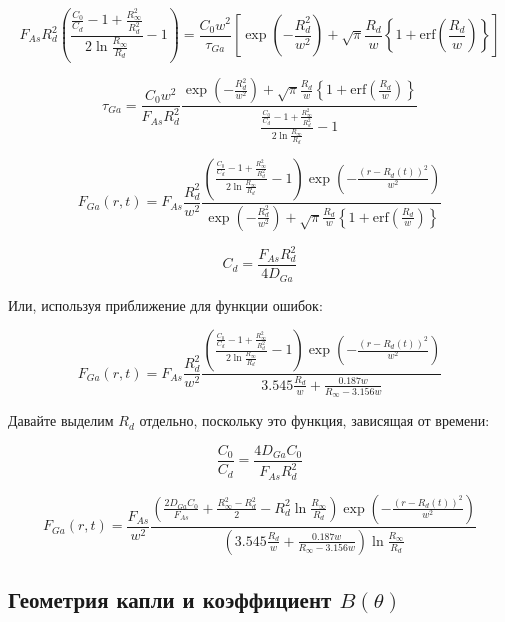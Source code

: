 \documentclass[14pt,oneside]{extarticle}
\begin{document}
\[
F_{As}R_{d}^{2}\left(\frac{\frac{C_{0}}{C_{d}}-1+\frac{R_{\infty}^{2}}{R_{d}^{2}}}{2\ln\frac{R_{\infty}}{R_{d}}}-1\right)=\frac{C_{0}w^{2}}{\tau_{Ga}}\left[\exp\left(-\frac{R_{d}^{2}}{w^{2}}\right)+\sqrt{\pi}\frac{R_{d}}{w}\left\{ 1+\text{erf}\left(\frac{R_{d}}{w}\right)\right\} \right]
\]

\[
\tau_{Ga}=\frac{C_{0}w^{2}}{F_{As}R_{d}^{2}}\frac{\exp\left(-\frac{R_{d}^{2}}{w^{2}}\right)+\sqrt{\pi}\frac{R_{d}}{w}\left\{ 1+\text{erf}\left(\frac{R_{d}}{w}\right)\right\} }{\frac{\frac{C_{0}}{C_{d}}-1+\frac{R_{\infty}^{2}}{R_{d}^{2}}}{2\ln\frac{R_{\infty}}{R_{d}}}-1}
\]

\begin{equation}
    F_{Ga}\left(r,t\right)=F_{As}\frac{R_{d}^{2}}{w^{2}}\frac{\left(\frac{\frac{C_{0}}{C_{d}}-1+\frac{R_{\infty}^{2}}{R_{d}^{2}}}{2\ln\frac{R_{\infty}}{R_{d}}}-1\right)\exp\left(-\frac{\left(r-R_{d}\left(t\right)\right)^{2}}{w^{2}}\right)}{\exp\left(-\frac{R_{d}^{2}}{w^{2}}\right)+\sqrt{\pi}\frac{R_{d}}{w}\left\{ 1+\text{erf}\left(\frac{R_{d}}{w}\right)\right\} }
\end{equation}

\[
C_{d}=\frac{F_{As}R_{d}^{2}}{4D_{Ga}}
\]

Или, используя приближение для функции ошибок:

\[
F_{Ga}\left(r,t\right)=F_{As}\frac{R_{d}^{2}}{w^{2}}\frac{\left(\frac{\frac{C_{0}}{C_{d}}-1+\frac{R_{\infty}^{2}}{R_{d}^{2}}}{2\ln\frac{R_{\infty}}{R_{d}}}-1\right)\exp\left(-\frac{\left(r-R_{d}\left(t\right)\right)^{2}}{w^{2}}\right)}{3.545\frac{R_{d}}{w}+\frac{0.187w}{R_{\infty}-3.156w}}
\]

Давайте выделим $R_{d}$ отдельно, поскольку это функция, зависящая от времени:

\[
\frac{C_{0}}{C_{d}}=\frac{4D_{Ga}C_{0}}{F_{As}R_{d}^{2}}
\]

\begin{equation}
    F_{Ga}\left(r,t\right)=\frac{F_{As}}{w^{2}}\frac{\left(\frac{2D_{Ga}C_{0}}{F_{As}}+\frac{R_{\infty}^{2}-R_{d}^{2}}{2}-R_{d}^{2}\ln\frac{R_{\infty}}{R_{d}}\right)\exp\left(-\frac{\left(r-R_{d}\left(t\right)\right)^{2}}{w^{2}}\right)}{\left(3.545\frac{R_{d}}{w}+\frac{0.187w}{R_{\infty}-3.156w}\right)\ln\frac{R_{\infty}}{R_{d}}}
\end{equation}

\subsection{Геометрия капли и коэффициент $B(\theta)$}
\end{document}
